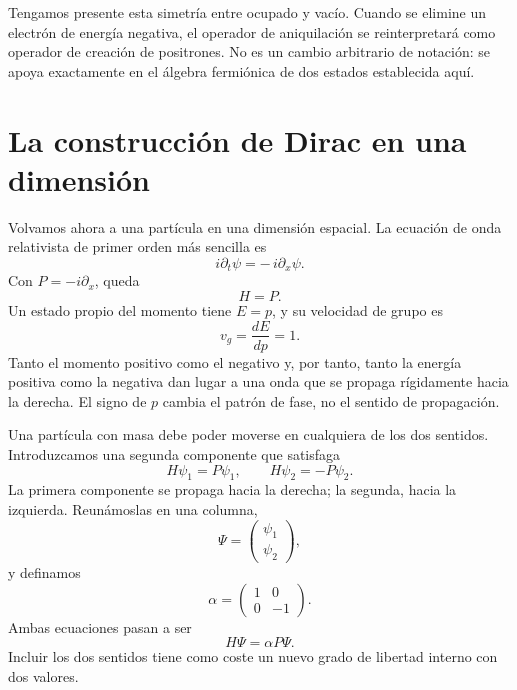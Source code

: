Tengamos presente esta simetría entre ocupado y vacío. Cuando se elimine un electrón de energía negativa, el operador de aniquilación se reinterpretará como operador de creación de positrones. No es un cambio arbitrario de notación: se apoya exactamente en el álgebra fermiónica de dos estados establecida aquí.

\section{La construcción de Dirac en una dimensión}

Volvamos ahora a una partícula en una dimensión espacial. La ecuación de onda relativista de primer orden más sencilla es
\begin{equation}
i\partial_t\psi=-\,i\partial_x\psi.
\label{eq:l10-right-mover}
\end{equation}
Con \(P=-i\partial_x\), queda
\begin{equation}
H=P.
\end{equation}
Un estado propio del momento tiene \(E=p\), y su velocidad de grupo es
\begin{equation}
v_g=\frac{dE}{dp}=1.
\end{equation}
Tanto el momento positivo como el negativo y, por tanto, tanto la energía positiva como la negativa dan lugar a una onda que se propaga rígidamente hacia la derecha. El signo de \(p\) cambia el patrón de fase, no el sentido de propagación.

Una partícula con masa debe poder moverse en cualquiera de los dos sentidos. Introduzcamos una segunda componente que satisfaga
\begin{equation}
H\psi_1=P\psi_1,
\qquad
H\psi_2=-P\psi_2.
\label{eq:l10-two-directions}
\end{equation}
La primera componente se propaga hacia la derecha; la segunda, hacia la izquierda. Reunámoslas en una columna,
\begin{equation}
\Psi=
\begin{pmatrix}
\psi_1\\
\psi_2
\end{pmatrix},
\end{equation}
y definamos
\begin{equation}
\alpha=
\begin{pmatrix}
1&0\\
0&-1
\end{pmatrix}.
\end{equation}
Ambas ecuaciones pasan a ser
\begin{equation}
H\Psi=\alpha P\Psi.
\label{eq:l10-massless-one-d}
\end{equation}
Incluir los dos sentidos tiene como coste un nuevo grado de libertad interno con dos valores.

